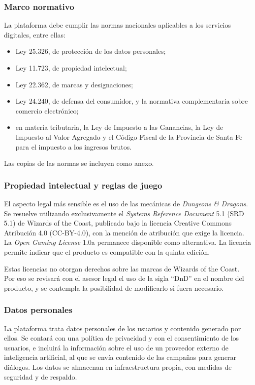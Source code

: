 \subsubsection{Marco normativo}
La plataforma debe cumplir las normas nacionales aplicables a los servicios digitales, entre ellas:
\begin{itemize}
  \item Ley 25.326, de protección de los datos personales;
  \item Ley 11.723, de propiedad intelectual;
  \item Ley 22.362, de marcas y designaciones;
  \item Ley 24.240, de defensa del consumidor, y la normativa complementaria sobre comercio electrónico;
  \item en materia tributaria, la Ley de Impuesto a las Ganancias, la Ley de Impuesto al Valor Agregado y el Código Fiscal de la Provincia de Santa Fe para el impuesto a los ingresos brutos.
\end{itemize}
Las copias de las normas se incluyen como anexo.

\subsubsection{Propiedad intelectual y reglas de juego}
El aspecto legal más sensible es el uso de las mecánicas de \textit{Dungeons \& Dragons}. Se resuelve utilizando exclusivamente el \textit{Systems Reference Document} 5.1 (SRD 5.1) de Wizards of the Coast, publicado bajo la licencia Creative Commons Atribución 4.0 (CC-BY-4.0), con la mención de atribución que exige la licencia. La \textit{Open Gaming License} 1.0a permanece disponible como alternativa. La licencia permite indicar que el producto es compatible con la quinta edición.

Estas licencias no otorgan derechos sobre las marcas de Wizards of the Coast. Por eso se revisará con el asesor legal el uso de la sigla \enquote{DnD} en el nombre del producto, y se contempla la posibilidad de modificarlo si fuera necesario.

\subsubsection{Datos personales}
La plataforma trata datos personales de los usuarios y contenido generado por ellos. Se contará con una política de privacidad y con el consentimiento de los usuarios, e incluirá la información sobre el uso de un proveedor externo de inteligencia artificial, al que se envía contenido de las campañas para generar diálogos. Los datos se almacenan en infraestructura propia, con medidas de seguridad y de respaldo.

